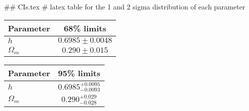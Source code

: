 ## CIs.tex
# latex table for the 1 and 2 sigma distribution of each parameter

\begin{tabular} { l  c}
 Parameter &  68\% limits\\
\hline
{\boldmath$h              $} & $0.6985\pm 0.0048          $\\
{\boldmath$\Omega_m       $} & $0.290\pm 0.015            $\\
\hline
\end{tabular}

\begin{tabular} { l  c}
 Parameter &  95\% limits\\
\hline
{\boldmath$h              $} & $0.6985^{+0.0095}_{-0.0093}$\\
{\boldmath$\Omega_m       $} & $0.290^{+0.029}_{-0.028}   $\\
\hline
\end{tabular}
